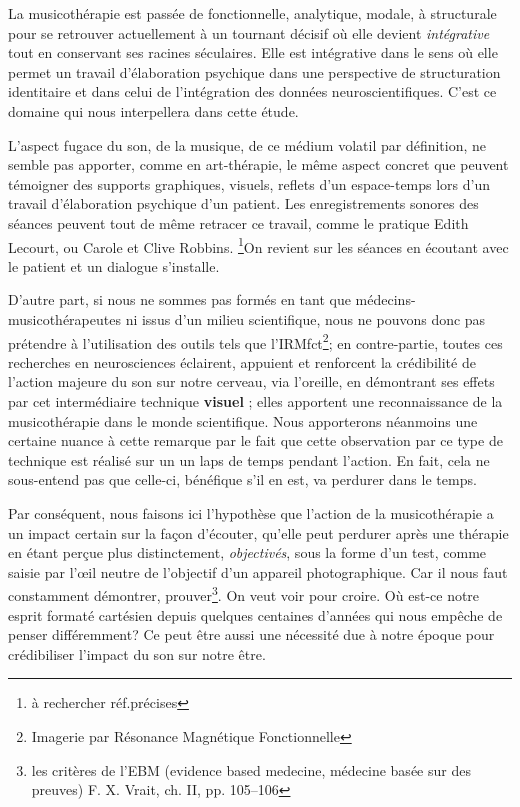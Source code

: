  La musicothérapie est passée de fonctionnelle, analytique, mo\-da\-le,  à 
struc\-tu\-rale pour se retrouver actuellement 
 à un tournant décisif où elle devient 
 \emph{intégrative} tout en conservant ses racines séculaires. Elle est 
intégrative dans le sens où elle permet un travail d'élaboration psychique dans 
une perspective de structuration identitaire \autocite[ch. III, p. 53, 
105]{vrait_musicotherapie_2018} et dans celui de l'intégration des données 
neuroscientifiques.
C'est ce domaine qui nous interpellera dans cette étude.


 
  
L'aspect fugace du son, de la musique, de ce médium volatil par
définition, ne semble pas apporter, comme en art-thérapie, le
même aspect concret que peuvent témoigner des supports graphiques,
visuels, reflets d'un espace-temps lors d'un travail d'élaboration
psychique d'un patient. Les enregistrements sonores des séances peuvent tout de 
même retracer ce travail, comme le pratique Edith Lecourt, ou Carole et Clive 
Robbins. \footnote{à rechercher réf.précises}On revient sur les séances en écoutant avec le patient et un dialogue s'installe.


D'autre part, si nous ne sommes pas formés en tant que médecins-musicothérapeutes ni issus 
d'un milieu scientifique, nous ne pouvons donc  pas prétendre à l'utilisation 
des outils
 tels que l'IRMfct\footnote{Imagerie par Résonance Magnétique Fonctionnelle}; 
en contre-partie, toutes ces recherches en
neurosciences éclairent, appuient et renforcent la crédibilité de l'action
majeure du son sur notre cerveau, via l'oreille, en démontrant ses effets par cet intermédiaire technique \textbf{visuel} ; elles apportent une 
reconnaissance de la musicothérapie dans le monde scientifique. Nous apporterons néanmoins une certaine nuance à cette remarque par le fait que cette observation par ce type de technique est réalisé sur un un laps de temps pendant l'action. En fait, cela ne sous-entend pas que celle-ci, bénéfique s'il en est, va perdurer dans le temps. 

Par conséquent, nous  faisons ici l'hypothèse que l'action de la 
musicothérapie a un impact certain sur la façon d'écouter, qu'elle peut perdurer après une thérapie en étant 
perçue plus
distinctement, \textsl{objectivés}, sous la forme d'un test, comme saisie par 
l'\oe il neutre de l'objectif d'un appareil
photographique.
Car il nous faut constamment démontrer, prouver\footnote{
	les critères de l'EBM (evidence based medecine, médecine basée sur des 
preuves) F. X. Vrait, ch. II, pp. 105--106 }. On veut voir pour croire. Où est-ce 
notre esprit formaté cartésien depuis quelques centaines d'années qui nous 
empêche de penser différemment? 
Ce peut être aussi une nécessité due à notre époque pour crédibiliser l'impact 
du son sur notre être. 


